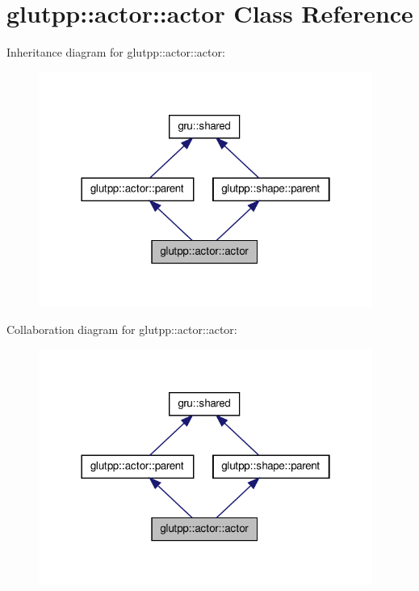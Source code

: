 \hypertarget{classglutpp_1_1actor_1_1actor}{\section{glutpp\-:\-:actor\-:\-:actor \-Class \-Reference}
\label{classglutpp_1_1actor_1_1actor}
}


\-Inheritance diagram for glutpp\-:\-:actor\-:\-:actor\-:\nopagebreak
\begin{figure}[H]
\begin{center}
\leavevmode
\includegraphics[width=310pt]{classglutpp_1_1actor_1_1actor__inherit__graph}
\end{center}
\end{figure}


\-Collaboration diagram for glutpp\-:\-:actor\-:\-:actor\-:\nopagebreak
\begin{figure}[H]
\begin{center}
\leavevmode
\includegraphics[width=310pt]{classglutpp_1_1actor_1_1actor__coll__graph}
\end{center}
\end{figure}
